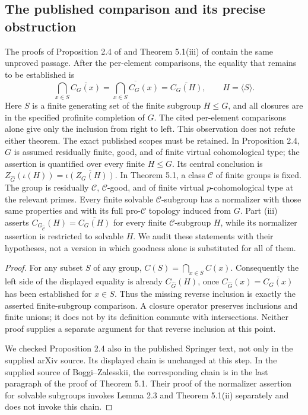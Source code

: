 \subsection*{The published comparison and its precise obstruction}

The proofs of Proposition 2.4 of \citet{Boggi2026} and Theorem 5.1(iii) of
\citet{BoggiZalesskii2025} contain the same unproved passage. After the
per-element comparisons, the equality that remains to be established is
\[
 \bigcap_{x\in S}\overline{C_G(x)}
       =\overline{\bigcap_{x\in S}C_G(x)}
       =\overline{C_G(H)},\qquad H=\langle S\rangle .
\]
Here \(S\) is a finite generating set of the finite subgroup \(H\leq G\),
and all closures are in the specified profinite completion of \(G\).
The cited per-element comparisons alone give only the inclusion from right
to left. This observation does not refute either theorem.
The exact published scopes must be retained. In Proposition 2.4,
$G$ is assumed residually finite, good, and of finite virtual
cohomological type; the assertion is quantified over every finite
$H\leq G$. Its central conclusion is
$Z_{\widehat G}(\iota(H))=\overline{\iota(Z_G(H))}$.
In Theorem 5.1, a class $\mathscr C$ of finite groups is fixed.
The group is residually $\mathscr C$, $\mathscr C$-good, and of
finite virtual $p$-cohomological type at the relevant primes.
Every finite solvable $\mathscr C$-subgroup has a normalizer with
those same properties and with its full pro-$\mathscr C$ topology
induced from $G$. Part (iii) asserts
$C_{G_{\widehat{\mathscr C}}}(H)=\overline{C_G(H)}$
for every finite $\mathscr C$-subgroup $H$, while its normalizer
assertion is restricted to solvable $H$.
We audit these statements with their hypotheses, not a version
in which goodness alone is substituted for all of them.

\begin{proof}
For any subset \(S\) of any group, \(C(S)=\bigcap_{x\in S}C(x)\).
Consequently the left side of the displayed equality is already
\(C_{\widehat G}(H)\), once \(C_{\widehat G}(x)=\overline{C_G(x)}\)
has been established for \(x\in S\). Thus the missing reverse inclusion
is exactly the asserted finite-subgroup comparison. A closure operator
preserves inclusions and finite unions; it does not by its definition
commute with intersections. Neither proof supplies a separate argument
for that reverse inclusion at this point.

We checked Proposition 2.4 also in the published Springer text, not only
in the supplied arXiv source. Its displayed chain is unchanged at this
step. In the supplied source of Boggi--Zalesskii, the corresponding chain
is in the last paragraph of the proof of Theorem 5.1. Their proof of the
normalizer assertion for solvable subgroups invokes Lemma 2.3 and
Theorem 5.1(ii) separately and does not invoke this chain.
\end{proof}

